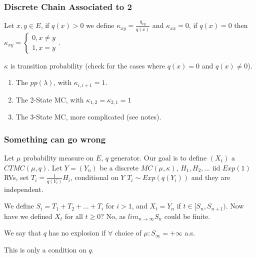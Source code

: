 \subsubsection{Discrete Chain Associated to 2}
\begin{defn}
	Let $x,y \in E$, if $q(x)> 0$ we define $\kappa_{xy}= \frac{q_{xy}}{q(x)}$ and $\kappa_{xx}=0$, if $q(x)=0$ then $\kappa_{xy}= 
	\begin{cases}
		0, x \neq y \\
		1, x =y 
	\end{cases}
	$.
\end{defn}

\begin{rmk}[]
	$\kappa $ is transition probability (check for the cases where $q(x) = 0$ and $q(x)\neq 0$). 
\end{rmk}

\begin{ex}[]
\begin{enumerate}
	\item The $pp(\lambda)$, with $\kappa_{i,i+1}=1$.
	\item The 2-State MC, with $\kappa_{1,2}=\kappa_{2,1}=1$ 
	\item The 3-State MC, more complicated (see notes).
\end{enumerate}

\end{ex}

\subsubsection{Something can go wrong}
Let $\mu $ probability measure on $E$, $q$ generator. Our goal is to define $(X_t)$ a $CTMC(\mu, q)$. Let $Y= (Y_n)$ be a discrete $MC(\mu, \kappa)$, $H_1, H_2,...$ iid $Exp(1)$ RVs, set $T_i = \frac{1}{q(Y_i)} H_i$, conditional on $Y$ $T_i \sim Exp(q(Y_i))$ and they are independent.

We define $S_i = T_1 + T_2 + ... + T_i$ for $i>1$, and $X_t = Y_n$ if $t \in [S_n, S_{n+1})$. Now have we defined $X_t$ for all $t\geq 0$? No, as $lim_{n \to \infty }S_n $ could be finite. 

\begin{defn}
	We say that $q$ has no explosion if $\forall $ choice of $\mu: S_{ \infty } = + \infty $ a.s.
\end{defn}

\begin{rmk}[]
	This is only a condition on $q$.
\end{rmk}

